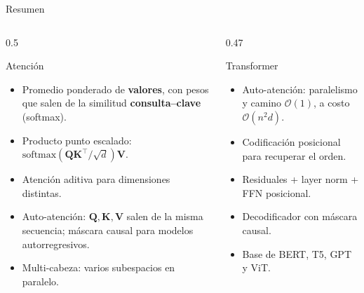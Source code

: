\documentclass[aspectratio=169, 10pt]{beamer}
\newcommand{\Q}{\mathbf{Q}}
\newcommand{\K}{\mathbf{K}}
\newcommand{\Vm}{\mathbf{V}}
\newcommand{\softmax}{\mathrm{softmax}}
\begin{document}
\begin{frame}{Resumen}
	\begin{columns}[T]
		\begin{column}{0.5\textwidth}
			\begin{block}{Atenci\'on}
				\small
				\begin{itemize}
					\item Promedio ponderado de \textbf{valores}, con pesos que salen de la similitud \textbf{consulta--clave} (softmax).
					\item Producto punto escalado: $\softmax(\Q\K^\top/\sqrt d)\Vm$.
					\item Atenci\'on aditiva para dimensiones distintas.
					\item Auto-atenci\'on: $\mathbf{Q},\mathbf{K},\mathbf{V}$ salen de la misma secuencia; m\'ascara causal para modelos autorregresivos.
					\item Multi-cabeza: varios subespacios en paralelo.
				\end{itemize}
			\end{block}
		\end{column}
		\begin{column}{0.47\textwidth}
			\begin{block}{Transformer}
				\small
				\begin{itemize}
					\item Auto-atenci\'on: paralelismo y camino $\mathcal{O}(1)$, a costo $\mathcal{O}(n^2d)$.
					\item Codificaci\'on posicional para recuperar el orden.
					\item Residuales + layer norm + FFN posicional.
					\item Decodificador con m\'ascara causal.
					\item Base de BERT, T5, GPT y ViT.
				\end{itemize}
			\end{block}
		\end{column}
	\end{columns}
\end{frame}
\end{document}
